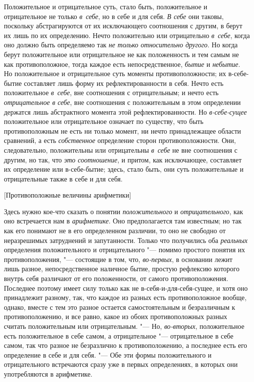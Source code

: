 Положительное и отрицательное суть, стало быть, положительное и
отрицательное не только {\em в~себе}, но в себе и для
себя. {\em В себе} они таковы, поскольку абстрагируются
от их исключающего соотношения с другим, в берут их лишь по их определению.
Нечто положительно или отрицательно {\em в~себе}, когда
оно должно быть определяемо так {\em не только
относительно другого}. Но когда берут положительное или отрицательное не
как положенность и тем самым не как противоположное, тогда каждое есть
непосредственное, {\em бытие} и
{\em небытие}. Но положительное и отрицательное суть
моменты противоположности; их в-себе-бытие составляет лишь форму их
рефлектированности в себя. Нечто есть положительное
{\em в~себе}, вне соотношения с отрицательным; и нечто
есть {\em отрицательное в себе}, вне соотношения с
положительным
в этом определении держатся лишь абстрактного момента этой
рефлектированности. Но {\em в-себе-сущее} положительное
или отрицательное означает по существу, что быть противоположным не есть ни
только момент, ни нечто принадлежащее области сравнений, а есть
{\em собственное} определение сторон противоположности.
Они, следовательно, положительны или отрицательны
{\em в~себе} не вне соотношения с другим, но так, что
{\em это соотношение}, и притом, как исключающее,
составляет их определение или в-себе-бытие; здесь, стало быть, они суть
положительные и отрицательные также в себе и для себя.

%
  {[Противоположные величины арифметики]}

Здесь нужно кое-что сказать о понятии {\em положительного} и
{\em отрицательного}, как оно встречается нам в
{\em арифметике}. Оно предполагается там известным; но
так как его понимают не в его определенном различии, то оно не свободно от
неразрешимых затруднений и запутанности. Только что получились оба
{\em реальных} определения положительного и
отрицательного "--- помимо простого понятия их противоположения,
"--- состоящие в том, что, {\em во-первых}, в основании лежит лишь
разное, непосредственное наличное бытие, простую рефлексию которого внутрь
себя различают от его положенности, от самого противоположения. Последнее
поэтому имеет силу только как не в-себя-и-для-себя-сущее, и хотя оно
принадлежит разному, так, что каждое из разных есть противоположное вообще,
однако, вместе с тем это разное остается самостоятельным и безразличным к
противоположению, и все равно, какое из обоих противоположных разных
считать положительным или отрицательным. "--- Но,
{\em во-вторых}, положительное есть положительное в
себе самом, а отрицательное "--- отрицательное в себе самом, так что разное не
безразлично к противоположению, а последнее есть его определение в себе и
для себя. "--- Обе эти формы положительного и отрицательного встречаются сразу
уже в первых определениях, в которых они употребляются в арифметике.

